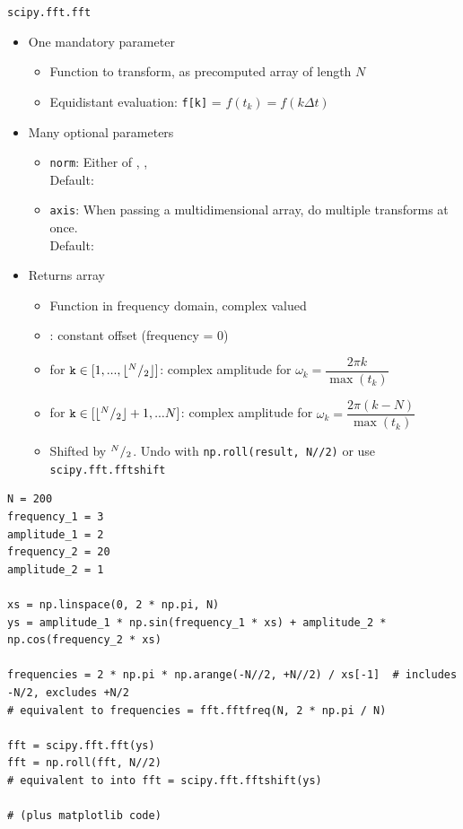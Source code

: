 \begin{frame}{\texttt{scipy.fft.fft}}
%
\begin{itemize}
\item One mandatory parameter
	\begin{itemize}
	\item Function to transform, as precomputed array of length $N$
	\item Equidistant evaluation: \texttt{f[k]} = $f(t_k) = f(k \Delta t)$
	\end{itemize}
\item Many optional parameters
	\begin{itemize}
	\item \texttt{norm}: Either of , , \\
		Default: 
	\item \texttt{axis}: When passing a multidimensional array, do multiple transforms at once.\\
		Default: 
	\end{itemize}
\item Returns array
	\begin{itemize}
	\item Function in frequency domain, complex valued
	\item {}: constant offset (frequency = 0)
	\item {} for $\texttt{k} \in [1, ..., \lfloor {}^{N}/_{2} \rfloor]$: complex amplitude for $\omega_k = \dfrac{2\pi k}{\max(t_k)}$
	\item {} for $\texttt{k} \in [\lfloor {}^{N}/_{2} \rfloor + 1, ... N]$: complex amplitude for $\omega_k = \dfrac{2\pi (k-N)}{\max(t_k)}$
	\item[\Thus] Shifted by ${}^{N}/_{2}$. Undo with \texttt{np.roll(result, N//2)} or use \texttt{scipy.fft.fftshift}
	\end{itemize}
\end{itemize}
%
\end{frame}


\begin{frame}[fragile]
%
\begin{codebox}
\begin{verbatim}
N = 200
frequency_1 = 3
amplitude_1 = 2
frequency_2 = 20
amplitude_2 = 1

xs = np.linspace(0, 2 * np.pi, N)
ys = amplitude_1 * np.sin(frequency_1 * xs) + amplitude_2 * np.cos(frequency_2 * xs)

frequencies = 2 * np.pi * np.arange(-N//2, +N//2) / xs[-1]  # includes -N/2, excludes +N/2
# equivalent to frequencies = fft.fftfreq(N, 2 * np.pi / N)

fft = scipy.fft.fft(ys)
fft = np.roll(fft, N//2)
# equivalent to into fft = scipy.fft.fftshift(ys)

# (plus matplotlib code)
\end{verbatim}
\end{codebox}
%
\end{frame}

